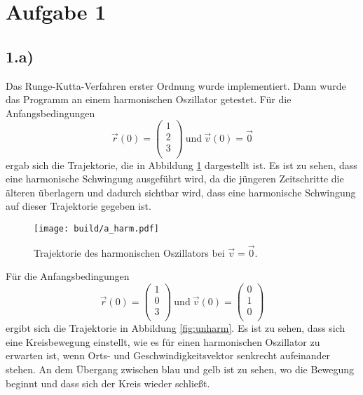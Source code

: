 \section*{Aufgabe 1}
\subsection*{1.a)}
Das Runge-Kutta-Verfahren erster Ordnung wurde implementiert. Dann wurde das
Programm an einem harmonischen Oszillator getestet.
Für die Anfangsbedingungen
\begin{equation*}
  \vec{r}(0) = \begin{pmatrix}
  1 \\ 2 \\ 3 \\
\end{pmatrix} \ \text{und} \
\vec{v}(0) = \vec{0}
\end{equation*}
ergab sich die Trajektorie, die in Abbildung \ref{fig:harm} dargestellt ist. Es
ist zu sehen, dass eine harmonische Schwingung ausgeführt wird, da die jüngeren
Zeitschritte die älteren überlagern und dadurch sichtbar wird, dass eine
harmonische Schwingung auf dieser Trajektorie gegeben ist.

\begin{figure}
  \centering
  \texttt{[image: build/a\_harm.pdf]}
  \caption{Trajektorie des harmonischen Oszillators bei $\vec{v} = \vec{0}$.}
  \label{fig:harm}
\end{figure}

Für die Anfangsbedingungen
\begin{equation*}
  \vec{r}(0) = \begin{pmatrix}
  1 \\ 0 \\ 3 \\
\end{pmatrix} \ \text{und} \
\vec{v}(0) = \begin{pmatrix}
  0 \\ 1 \\ 0 \\
\end{pmatrix}
\end{equation*}
ergibt sich die Trajektorie in Abbildung \ref{fig:unharm}. Es ist zu sehen, dass
sich eine Kreisbewegung einstellt, wie es für einen harmonischen Oszillator
zu erwarten ist, wenn Orts- und Geschwindigkeitsvektor senkrecht aufeinander stehen.
An dem Übergang zwischen blau und gelb ist zu sehen, wo die Bewegung beginnt
und dass sich der Kreis wieder schließt.

